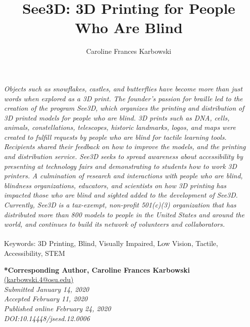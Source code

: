 \documentclass[11.5pt]{sig-alternate} %
\makeatletter
\let\oldabstract\abstract
\let\oldendabstract\endabstract
\renewenvironment{abstract}
{\renewenvironment{quotation}%
               {\list{}{\addtolength{\leftmargin}{1em} %
                        \listparindent 1.5em%
                        \itemindent    \listparindent%
                        \rightmargin   \leftmargin%
                        \parsep        \z@ \@plus\p@}%
                \item\relax}%
               {\endlist}%
\oldabstract}
{\oldendabstract}
\makeatother
\begin{document}
\title{See3D: 3D Printing for People Who Are Blind}

\author[1]{\large \color{blue}Caroline Frances Karbowski}


\toappear{}
\maketitle
\begin{@twocolumnfalse} 
\begin{abstract}
\item 
\textit {Objects such as snowflakes, castles, and butterflies have become more than just words when explored as a 3D print. The founder’s passion for braille led to the creation of the program See3D, which organizes the printing and distribution of 3D printed models for people who are blind. 3D prints such as DNA, cells, animals, constellations, telescopes, historic landmarks, logos, and maps were created to fulfill requests by people who are blind for tactile learning tools. Recipients shared their feedback on how to improve the models, and the printing and distribution service. See3D seeks to spread awareness about accessibility by presenting at technology fairs and demonstrating to students how to work 3D printers. A culmination of research and interactions with people who are blind, blindness organizations, educators, and scientists on how 3D printing has impacted those who are blind and sighted added to the development of See3D. Currently, See3D is a tax-exempt, non-profit 501(c)(3) organization that has distributed more than 800 models to people in the United States and around the world, and continues to build its network of volunteers and collaborators.}
\\ \\
Keywords: 3D Printing, Blind, Visually Impaired, Low Vision, Tactile, Accessibility, STEM
\end{abstract}
\end{@twocolumnfalse}


\textbf{*Corresponding Author, Caroline Frances Karbowski}\\
\href{mailto: karbowski.4@osu.edu }{(karbowski.4@osu.edu)} \\
\textit{Submitted January 14, 2020 }\\
\textit{Accepted February 11, 2020} \\
\textit{Published online February 24, 2020} \\
\textit{DOI:10.14448/jsesd.12.0006} \\
\pagebreak
\clearpage
\end{document}
